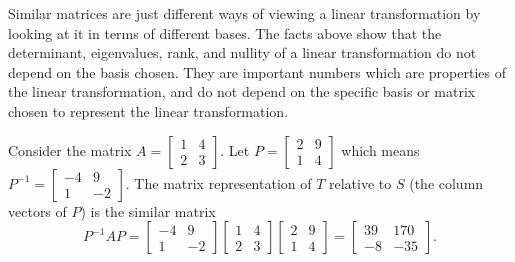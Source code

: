       Similar matrices are just different ways of viewing a linear transformation by looking at it in terms of different bases. The facts above show that the determinant, eigenvalues, rank, and nullity of a linear transformation do not depend on the basis chosen. They are important numbers which are properties of the linear transformation, and do not depend on the specific basis or matrix  chosen to represent the linear transformation.

\begin{example}
 Consider the matrix
 $A=  
\begin{bmatrix}
 1 & 4 \\
 2 & 3
\end{bmatrix} 
$. Let
$P=
\begin{bmatrix}
 2 & 9 \\
 1 & 4
\end{bmatrix} 
$ which means 
$P^{-1} = 
\begin{bmatrix}
 -4 & 9 \\
 1 & -2
\end{bmatrix} 
$. The matrix representation of $T$ relative to $S$ (the column vectors of $P$) is the similar matrix 
$$
P^{-1}AP=\begin{bmatrix}
 -4 & 9 \\
 1 & -2
\end{bmatrix} 
 \begin{bmatrix}
 1 & 4 \\
 2 & 3
\end{bmatrix} 
\begin{bmatrix}
 2 & 9 \\
 1 & 4
\end{bmatrix} 
=
\begin{bmatrix}
 39 & 170 \\
 -8 & -35
\end{bmatrix} 
.$$

\item


\end{example}
